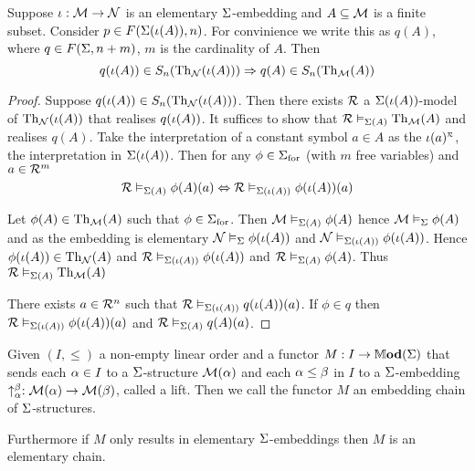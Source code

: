 \begin{lem}
    Suppose $\iota : \mathcal{M} \to \mathcal{N}$ is an elementary $\Sigma$-embedding
    and $A \subseteq \mathcal{M}$ is a finite subset.
    Consider $p \in F(\Sigma(\iota(A)),n)$.
    For convinience we write this as $q(A)$, 
    where $q \in F(\Sigma, n + m)$,
    $m$ is the cardinality of $A$.
    Then 
    \[q(\iota(A)) \in S_n(\mathrm{Th}_{\mathcal{N}}(\iota(A)))
    \Rightarrow q(A) \in S_n(\mathrm{Th}_{\mathcal{M}}(A))\]
\end{lem}
\begin{proof}
    Suppose $q(\iota(A)) \in S_n(\mathrm{Th}_{\mathcal{N}}(\iota(A)))$.
    Then there exists $\mathcal{R}$ a $\Sigma(\iota(A))$-model of $\mathrm{Th}_{\mathcal{N}}(\iota(A))$ 
    that realises $q(\iota(A))$. 
    It suffices to show that $\mathcal{R} \vDash_{\Sigma(A)} \mathrm{Th}_{\mathcal{M}}(A)$ and 
    realises $q(A)$.
    Take the interpretation of a constant symbol $a \in A$ as the 
    $\modintp{\RR}{\io(a)}$, 
    the interpretation in $\Sigma(\iota(A))$.
    Then for any $\phi \in {\Sigma}_\mathrm{for}$ (with $m$ free variables) 
    and $a \in \mathcal{R}^m$
    \[\mathcal{R} \vDash_{\Sigma(A)} \phi(A)(a) \Leftrightarrow 
    \mathcal{R} \vDash_{\Sigma(\iota(A))} \phi(\iota(A))(a)\]

    Let $\phi(A) \in \mathrm{Th}_{\mathcal{M}}(A)$ such that $\phi \in {\Sigma}_\mathrm{for}$.
    Then $\mathcal{M} \vDash_{\Sigma(A)} \phi(A)$ hence $\mathcal{M} \vDash_{\Sigma} \phi(A)$
    and as the embedding is elementary $\mathcal{N} \vDash_{\Sigma} \phi(\iota(A))$
    and $\mathcal{N} \vDash_{\Sigma(\iota(A))} \phi(\iota(A))$.
    Hence $\phi(\iota(A)) \in \mathrm{Th}_{\mathcal{N}}(A)$ and 
    $\mathcal{R} \vDash_{\Sigma(\iota(A))} \phi(\iota(A))$ and 
    $\mathcal{R} \vDash_{\Sigma(A)} \phi(A)$.
    Thus $\mathcal{R} \vDash_{\Sigma(A)} \mathrm{Th}_{\mathcal{M}}(A)$
    
    There exists $a \in \mathcal{R}^n$ such that $\mathcal{R} \vDash_{\Sigma(\iota(A))} q(\iota(A))(a)$.
    If $\phi \in q$ then $\mathcal{R} \vDash_{\Sigma(\iota(A))} \phi(\iota(A))(a)$
    and $\mathcal{R} \vDash_{\Sigma(A)} q(A)(a)$.
\end{proof}

\begin{dfn}
    Given $(I,\leq)$ a non-empty linear order and a functor $M: I \to \mathbb{M} \mathbf{od}(\Sigma)$
    that sends each $\alpha \in I$ to a $\Sigma$-structure $\mathcal{M}(\alpha)$
    and each $\alpha \leq \beta$ in $I$ to a 
    $\Sigma$-embedding $\uparrow_{\alpha}^{\beta} : \mathcal{M}(\alpha) \to \mathcal{M}(\beta)$, called a lift.
    Then we call the functor $M$ an embedding chain of $\Sigma$-structures.

    Furthermore if $M$ only results in elementary $\Sigma$-embeddings
    then $M$ is an elementary chain.
\end{dfn}

